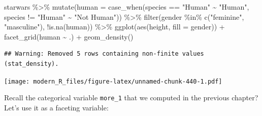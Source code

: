 \documentclass[
]{article}
\newenvironment{Shaded}{\begin{snugshade}}{\end{snugshade}}
\newcommand{\AttributeTok}[1]{\textcolor[rgb]{0.77,0.63,0.00}{#1}}
\newcommand{\FunctionTok}[1]{\textcolor[rgb]{0.00,0.00,0.00}{#1}}
\newcommand{\NormalTok}[1]{#1}
\newcommand{\SpecialCharTok}[1]{\textcolor[rgb]{0.00,0.00,0.00}{#1}}
\newcommand{\StringTok}[1]{\textcolor[rgb]{0.31,0.60,0.02}{#1}}
\begin{document}
\begin{Shaded}
\begin{Highlighting}[]
\NormalTok{starwars }\SpecialCharTok{\%\textgreater{}\%}
  \FunctionTok{mutate}\NormalTok{(}\AttributeTok{human =} \FunctionTok{case\_when}\NormalTok{(species }\SpecialCharTok{==} \StringTok{"Human"} \SpecialCharTok{\textasciitilde{}} \StringTok{"Human"}\NormalTok{,}
\NormalTok{                           species }\SpecialCharTok{!=} \StringTok{"Human"} \SpecialCharTok{\textasciitilde{}} \StringTok{"Not Human"}\NormalTok{)) }\SpecialCharTok{\%\textgreater{}\%}
  \FunctionTok{filter}\NormalTok{(gender }\SpecialCharTok{\%in\%} \FunctionTok{c}\NormalTok{(}\StringTok{"feminine"}\NormalTok{, }\StringTok{"masculine"}\NormalTok{), }\SpecialCharTok{!}\FunctionTok{is.na}\NormalTok{(human)) }\SpecialCharTok{\%\textgreater{}\%}
  \FunctionTok{ggplot}\NormalTok{(}\FunctionTok{aes}\NormalTok{(height, }\AttributeTok{fill =}\NormalTok{ gender)) }\SpecialCharTok{+}
  \FunctionTok{facet\_grid}\NormalTok{(human }\SpecialCharTok{\textasciitilde{}}\NormalTok{ .) }\SpecialCharTok{+}
  \FunctionTok{geom\_density}\NormalTok{()}
\end{Highlighting}
\end{Shaded}

\begin{verbatim}
## Warning: Removed 5 rows containing non-finite values (stat_density).
\end{verbatim}

\texttt{[image: modern\_R\_files/figure-latex/unnamed-chunk-440-1.pdf]}

Recall the categorical variable \texttt{more\_1} that we computed in the previous chapter? Let's use it as
a faceting variable:
\end{document}
